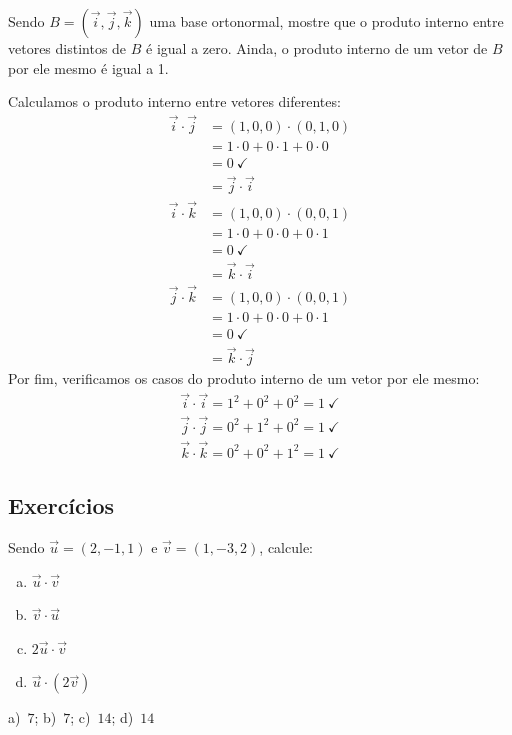 \begin{exeresol}
  Sendo $B=(\vec{i},\vec{j},\vec{k})$ uma base ortonormal, mostre que o produto interno entre vetores distintos de $B$ é igual a zero. Ainda, o produto interno de um vetor de $B$ por ele mesmo é igual a 1.
\end{exeresol}
\begin{resol}
  Calculamos o produto interno entre vetores diferentes:
  \begin{align}
    \vec{i}\cdot\vec{j} &= (1,0,0)\cdot (0,1,0)\\
                        &= 1\cdot 0 + 0\cdot 1 + 0\cdot 0 \\
                        &= 0~\checkmark\\
                        &= \vec{j}\cdot\vec{i}
  \end{align}
  \begin{align}
    \vec{i}\cdot\vec{k} &= (1,0,0)\cdot (0,0,1)\\
                        &= 1\cdot 0 + 0\cdot 0 + 0\cdot 1 \\
                        &= 0~\checkmark \\
                        &= \vec{k}\cdot\vec{i}
  \end{align}
  \begin{align}
    \vec{j}\cdot\vec{k} &= (1,0,0)\cdot (0,0,1)\\
                        &= 1\cdot 0 + 0\cdot 0 + 0\cdot 1 \\
                        &= 0~\checkmark \\
                        &= \vec{k}\cdot\vec{j}
  \end{align}
  Por fim, verificamos os casos do produto interno de um vetor por ele mesmo:
  \begin{gather}
    \vec{i}\cdot\vec{i} = 1^2+0^2+0^2 = 1~\checkmark\\
    \vec{j}\cdot\vec{j} = 0^2+1^2+0^2 = 1~\checkmark\\
    \vec{k}\cdot\vec{k} = 0^2+0^2+1^2 = 1~\checkmark
  \end{gather}
\end{resol}

\subsection*{Exercícios}

\begin{exer}
  Sendo $\vec{u}=(2,-1,1)$ e $\vec{v}=(1,-3,2)$, calcule:
  \begin{enumerate}[a)]
  \item $\vec{u}\cdot\vec{v}$
  \item $\vec{v}\cdot\vec{u}$
  \item $2\vec{u}\cdot\vec{v}$
  \item $\vec{u}\cdot(2\vec{v})$
  \end{enumerate}
\end{exer}
\begin{resp}
  a)~$7$; b)~$7$; c)~$14$; d)~$14$
\end{resp}

